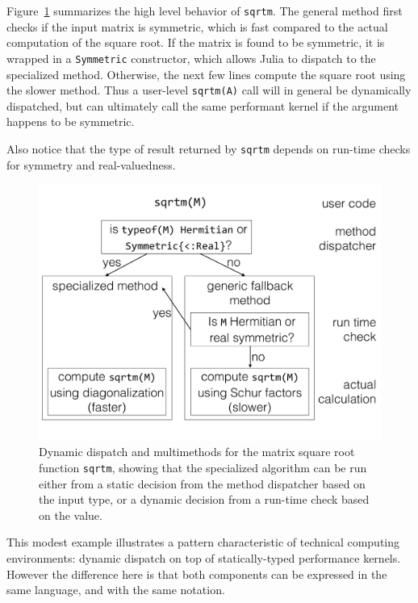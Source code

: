Figure~\ref{fig:sqrtm} summarizes the high level behavior of \lstinline|sqrtm|.
The general method first checks if the input matrix is symmetric, which is fast
compared to the actual computation of the square root. If the matrix is found to
be symmetric, it is wrapped in a \lstinline|Symmetric| constructor, which allows
Julia to dispatch to the specialized method. Otherwise, the next few lines
compute the square root using the slower method.
Thus a user-level \lstinline|sqrtm(A)| call will in
general be dynamically dispatched, but can ultimately call the same
performant kernel if the argument happens to be symmetric.

Also notice that the type of result returned by \lstinline|sqrtm| depends
on run-time checks for symmetry and real-valuedness.

\begin{figure}
	\centering
	\includegraphics[width=\columnwidth]{fig-sqrtm}
	\caption{Dynamic dispatch and multimethods for the matrix square root
		function \texttt{sqrtm}, showing that the specialized algorithm
		can be run either from a static decision from the method
		dispatcher based on the input type, or a dynamic decision from
		a run-time check based on the value.}
	\label{fig:sqrtm}
\end{figure}

This modest example illustrates a pattern characteristic of technical
computing environments: dynamic dispatch on top of statically-typed
performance kernels.
However the difference here is that both components can be expressed
in the same language, and with the same notation.

